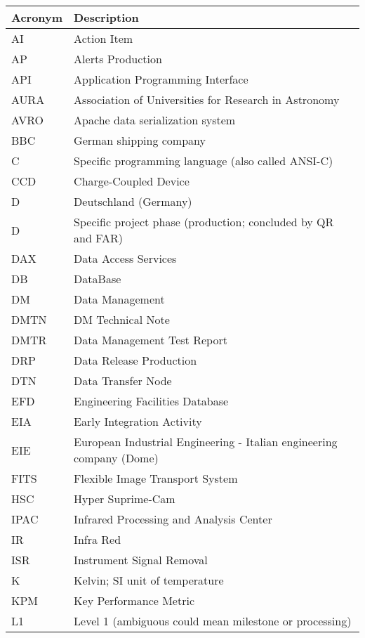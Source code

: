 \addtocounter{table}{-1}
\begin{longtable}{|l|p{}|}\hline
\textbf{Acronym} & \textbf{Description}  \\\hline

AI & Action Item \\\hline
AP & Alerts Production \\\hline
API & Application Programming Interface \\\hline
AURA & Association of Universities for Research in Astronomy \\\hline
AVRO & Apache data serialization system \\\hline
BBC & German shipping company \\\hline
C & Specific programming language (also called ANSI-C) \\\hline
CCD & Charge-Coupled Device \\\hline
D & Deutschland (Germany) \\\hline
D & Specific project phase (production; concluded by QR and FAR) \\\hline
DAX & Data Access Services \\\hline
DB & DataBase \\\hline
DM & Data Management \\\hline
DMTN & DM Technical Note \\\hline
DMTR & Data Management Test Report \\\hline
DRP & Data Release Production \\\hline
DTN & Data Transfer Node \\\hline
EFD & Engineering Facilities Database \\\hline
EIA & Early Integration Activity \\\hline
EIE & European Industrial Engineering  - Italian engineering company (Dome) \\\hline
FITS & Flexible Image Transport System \\\hline
HSC & Hyper Suprime-Cam \\\hline
IPAC & Infrared Processing and Analysis Center \\\hline
IR & Infra Red \\\hline
ISR & Instrument Signal Removal \\\hline
K & Kelvin; SI unit of temperature \\\hline
KPM & Key Performance Metric \\\hline
L1 & Level 1 (ambiguous could mean milestone or processing) \\\hline

\end{longtable}
